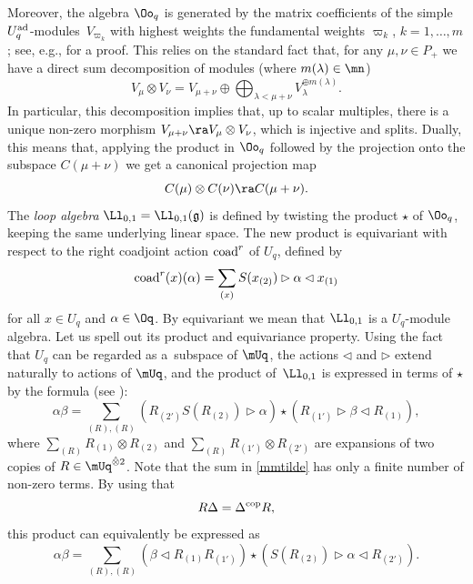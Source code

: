 Moreover, the algebra $\Oo_q$ is generated by the matrix coefficients of the simple $U_q^{\rm ad}$-modules~$V_{\!\varpi_{\!k}}$ with highest weights the fundamental weights $\varpi_k$, $k=1,\dots,m$; see, e.g., \cite[Proposition~I.7.8]{BG} for a proof. This relies on the standard fact that, for any $\mu,\nu \in P_+$ we have a direct sum decomposition of modules (where $m(\lambda)\in \mn$)
\begin{equation}\label{decomprep}
V_\mu\otimes V_\nu = V_{\mu+\nu} \oplus \bigoplus_{\lambda < \mu+\nu} V_\lambda^{\oplus m(\lambda)}.
\end{equation}
In particular, this decomposition implies that, up to scalar multiples, there is a unique non-zero morphism $V_{\mu+\nu} \ra V_\mu\otimes V_\nu$, which is injective and splits. Dually, this means that, applying the product in $\Oo_q$ followed by the projection onto the subspace $C(\mu+\nu)$ we get a canonical projection map
\begin{equation}\label{projOq}
C(\mu)\otimes C(\nu) \ra C(\mu+\nu).
\end{equation}
The {\it loop algebra} $\Ll_{0,1} = \Ll_{0,1}(\mathfrak{g})$ is defined by twisting the product $\star$ of $\Oo_q$, keeping the same underlying linear space. The new product is equivariant with respect to the right coadjoint action ${\rm coad}^r$ of $U_q$, defined by
\[{\rm coad}^r(x)(\alpha) = \sum_{(x)}{S}(x_{(2)}) \rhd \alpha \lhd x_{(1)}\]
for all $x\in U_q$ and $\alpha\in \Oq$. By equivariant we mean that $\Ll_{0,1}$ is a $U_q$-module algebra. Let us spell out its product and equivariance property. Using the fact that $U_q$ can be regarded as a~subspace of $\mUq$, the actions $\lhd$ and $\rhd$ extend naturally to actions of $\mUq$, and the product of~$\Ll_{0,1}$ is expressed in terms of $\star$ by the formula (see \cite[Proposition 4.1]{BR}):
\begin{equation}\label{mmtilde}
\alpha\beta = \sum_{(R),(R)}(R_{(2')}{S}(R_{(2)}) \rhd \alpha) \star (R_{(1')}\rhd \beta \lhd R_{(1)}),
\end{equation}
where $ \sum_{(R)}R_{(1) }\otimes R_{(2)}$ and $\sum_{(R)}R_{(1') }\otimes R_{(2')}$ are expansions of two copies of $R\in \mUq^{\hat \otimes 2}$. Note that the sum in \eqref{mmtilde} has only a finite number of non-zero terms. By using that
\[R\Delta = \Delta^{\rm cop}R,\]
 this product can equivalently be expressed as
\begin{equation}\label{mmtildebis}
\alpha\beta = \sum_{(R),(R)}(\beta \lhd R_{(1)}R_{(1')}) \star (S(R_{(2)})\rhd \alpha \lhd R_{(2')}).
\end{equation}
